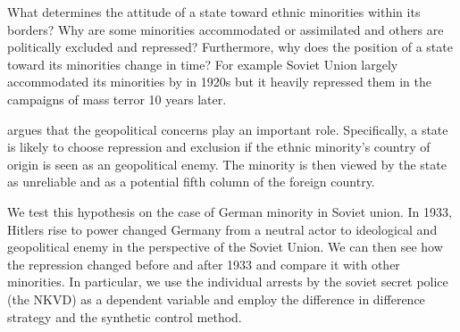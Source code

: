 What determines the attitude of a state toward ethnic minorities within
its borders? Why are some minorities accommodated or assimilated and
others are politically excluded and repressed? Furthermore,  why does the
position of a state toward its minorities change in time? For example
Soviet Union largely accommodated its minorities by in 1920s but it
heavily repressed them in the campaigns of  mass terror 10 years later. 

\citet{mylonas_politics_2013} argues that the geopolitical concerns play an important role. Specifically, a state is likely to choose repression and
exclusion if the ethnic minority's country of origin is seen as an
geopolitical enemy. The minority is then viewed by the state as
unreliable and as a potential fifth column of the foreign country.   

We test this hypothesis on the case of German minority in Soviet union.
In 1933, Hitlers rise to power changed Germany from a neutral actor to ideological and geopolitical enemy in the perspective of the Soviet Union. We can then see how the repression changed before and after 1933 and compare it with other minorities. In particular, we use the individual arrests by the soviet secret police (the NKVD) as a dependent variable and employ the difference in difference strategy and the synthetic control method. 





